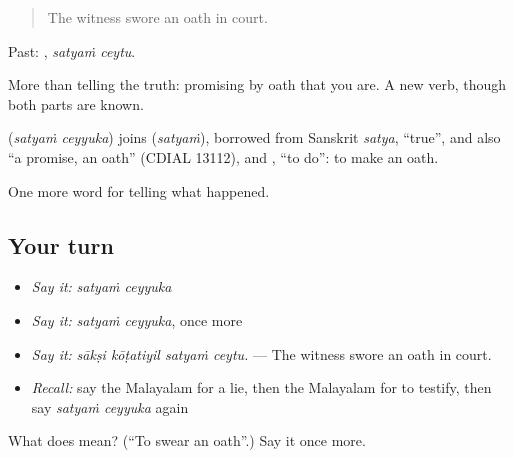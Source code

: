 \begin{quote}
The witness swore an oath in court.
\end{quote}

Past:  , \emph{satyaṁ ceytu}.

More than telling the truth: promising by oath that you are. A new verb, though both parts are known.

\begin{cousinweb}
\textbf{ } (\emph{satyaṁ ceyyuka}) joins  (\emph{satyaṁ}), borrowed from Sanskrit \emph{satya}, \textquotedblleft{}true\textquotedblright{}, and also \textquotedblleft{}a promise, an oath\textquotedblright{} (CDIAL 13112), and , \textquotedblleft{}to do\textquotedblright{}: to make an oath.
\end{cousinweb}

\begin{grammarlens}[title={What you've built}]
One more word for telling what happened.
\end{grammarlens}

\subsection*{Your turn}
\begin{itemize}
\raggedright
  \item \emph{Say it:} \emph{satyaṁ ceyyuka}
  \item \emph{Say it:} \emph{satyaṁ ceyyuka}, once more
  \item \emph{Say it:} \emph{sākṣi kōṭatiyil satyaṁ ceytu.} — The witness swore an oath in court.
  \item \emph{Recall:} say the Malayalam for a lie, then the Malayalam for to testify, then say \emph{satyaṁ ceyyuka} again
\end{itemize}

\begin{tcolorbox}[breakable,colback=teal!4,colframe=teal!35!black,title={Before you move on}]
What does   mean? (\textquotedblleft{}To swear an oath\textquotedblright{}.) Say it once more.
\end{tcolorbox}
